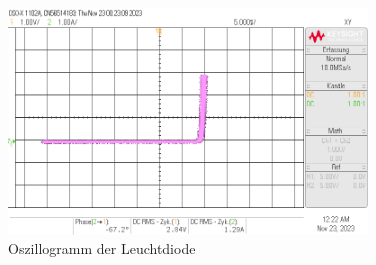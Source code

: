 \begin{enumerate}[label=\alph*)]
	      \begin{figure}[h!]
		      \begin{center}
			      \includegraphics[width=0.85\textwidth]{img/V1/3.2.Diode_Led.png}
			      \caption{Oszillogramm der Leuchtdiode}
		      \end{center}
	      \end{figure}
\end{enumerate}

\pagebreak
